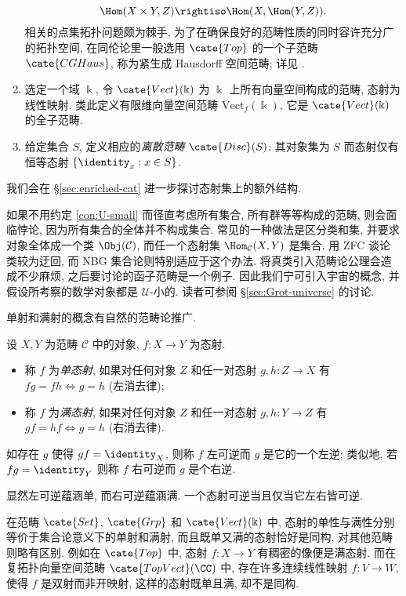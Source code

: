 \begin{example}
\begin{enumerate}
			\[ \Hom(X \times Y, Z) \rightiso \Hom(X, \Hom(Y, Z)). \]
			相关的点集拓扑问题颇为棘手, 为了在确保良好的范畴性质的同时容许充分广的拓扑空间, 在同伦论里一般选用 $\cate{Top}$ 的一个子范畴 $\cate{CGHaus}$, 称为紧生成 Hausdorff 空间范畴; 详见 \cite[Chapter 5]{May99}.
		\item 选定一个域 $\Bbbk$, 令 $\cate{Vect}(\Bbbk)$ 为 $\Bbbk$ 上所有向量空间构成的范畴, 态射为线性映射. 类此定义有限维向量空间范畴 $\text{Vect}_f(\Bbbk)$, 它是 $\cate{Vect}(\Bbbk)$ 的全子范畴. 
		\item 给定集合 $S$, 定义相应的\emph{离散范畴} $\cate{Disc}(S)$: 其对象集为 $S$ 而态射仅有恒等态射 $\{ \identity_x : x \in S \}$.
	\end{enumerate}
	我们会在 \S\ref{sec:enriched-cat} 进一步探讨态射集上的额外结构.
\end{example}

\begin{remark}
	如果不用约定 \ref{con:U-small} 而径直考虑所有集合, 所有群等等构成的范畴, 则会面临悖论, 因为所有集合的全体并不构成集合. 常见的一种做法是区分类和集, 并要求对象全体成一个类 $\Obj(\mathcal{C})$, 而任一个态射集 $\Hom_{\mathcal{C}}(X,Y)$ 是集合. 用 ZFC 谈论类较为迂回, 而 NBG 集合论则特别适应于这个办法. 将真类引入范畴论公理会造成不少麻烦, 之后要讨论的函子范畴是一个例子. 因此我们宁可引入宇宙的概念,  并假设所考察的数学对象都是 $\mathcal{U}$-小的. 读者可参阅 \S\ref{sec:Grot-universe} 的讨论.
\end{remark}

单射和满射的概念有自然的范畴论推广.
\begin{definition}
	设 $X, Y$ 为范畴 $\mathcal{C}$ 中的对象, $f: X \to Y$ 为态射.
	\begin{itemize}
		\item 称 $f$ 为\emph{单态射}, 如果对任何对象 $Z$ 和任一对态射 $g, h: Z \to X$ 有 $fg = fh \iff g=h$ (左消去律);
		\item 称 $f$ 为\emph{满态射}, 如果对任何对象 $Z$ 和任一对态射 $g, h: Y \to Z$ 有 $gf = hf \iff g=h$ (右消去律).
	\end{itemize}
	如存在 $g$ 使得 $gf=\identity_X$, 则称 $f$ 左可逆而 $g$ 是它的一个左逆; 类似地, 若 $fg = \identity_Y$ 则称 $f$ 右可逆而 $g$ 是个右逆.
\end{definition}
显然左可逆蕴涵单, 而右可逆蕴涵满. 一个态射可逆当且仅当它左右皆可逆.

在范畴 $\cate{Set}$, $\cate{Grp}$ 和 $\cate{Vect}(\Bbbk)$ 中, 态射的单性与满性分别等价于集合论意义下的单射和满射, 而且既单又满的态射恰好是同构. 对其他范畴则略有区别. 例如在 $\cate{Top}$ 中, 态射 $f: X \to Y$ 有稠密的像便是满态射. 而在复拓扑向量空间范畴 $\cate{TopVect}(\CC)$ 中, 存在许多连续线性映射 $f: V \to W$, 使得 $f$ 是双射而非开映射, 这样的态射既单且满, 却不是同构.

